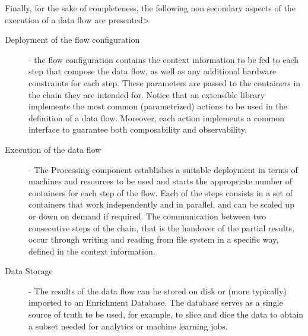  
Finally, for the sake of completeness, the following non secondary aspects of the execution of a data flow are presented>
\begin{description}
    \item[Deployment of the flow configuration] - the flow configuration contains the context information to be fed to each step that compose the data flow, as well as any additional hardware constraints for each step. These parameters are passed to the containers in the chain they are intended for. Notice that an extensible library implements the most common (parametrized) actions to be used in the definition of a data flow. Moreover, each action implements a common interface to guarantee both composability and observability. 
    
    \item[Execution of the data flow] - The Processing component establishes a suitable deployment in terms of machines and resources to be used and starts the appropriate number of containers for each step of the flow.  Each of the steps consists in a set of containers that work independently and in parallel, and can be scaled up or down on demand if required. The communication between two consecutive steps of the chain, that is the handover of the partial results, occur through writing and reading from file system in a specific way, defined in the context information.
    \item[Data Storage] - The results of the data flow can be stored on disk or (more typically) imported to an Enrichment Database. The database serves as a single source of truth to be used, for example, to slice and dice the data to obtain a subset needed for analytics or machine learning jobs. 
\end{description} 
